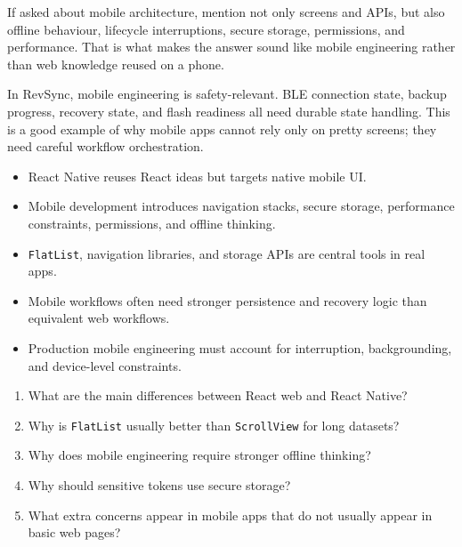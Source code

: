 \documentclass[12pt, a4paper, oneside]{book}
\begin{document}
\begin{examtipbox}
If asked about mobile architecture, mention not only screens and APIs, but also offline behaviour, lifecycle interruptions, secure storage, permissions, and performance. That is what makes the answer sound like mobile engineering rather than web knowledge reused on a phone.
\end{examtipbox}

\begin{projectbox}
In RevSync, mobile engineering is safety-relevant. BLE connection state, backup progress, recovery state, and flash readiness all need durable state handling. This is a good example of why mobile apps cannot rely only on pretty screens; they need careful workflow orchestration.
\end{projectbox}

\begin{summarybox}
\begin{itemize}[leftmargin=2em]
    \item React Native reuses React ideas but targets native mobile UI.
    \item Mobile development introduces navigation stacks, secure storage, performance constraints, permissions, and offline thinking.
    \item \texttt{FlatList}, navigation libraries, and storage APIs are central tools in real apps.
    \item Mobile workflows often need stronger persistence and recovery logic than equivalent web workflows.
    \item Production mobile engineering must account for interruption, backgrounding, and device-level constraints.
\end{itemize}
\end{summarybox}

\begin{recallbox}
\begin{enumerate}[leftmargin=2em]
    \item What are the main differences between React web and React Native?
    \item Why is \texttt{FlatList} usually better than \texttt{ScrollView} for long datasets?
    \item Why does mobile engineering require stronger offline thinking?
    \item Why should sensitive tokens use secure storage?
    \item What extra concerns appear in mobile apps that do not usually appear in basic web pages?
\end{enumerate}
\end{recallbox}
\end{document}

